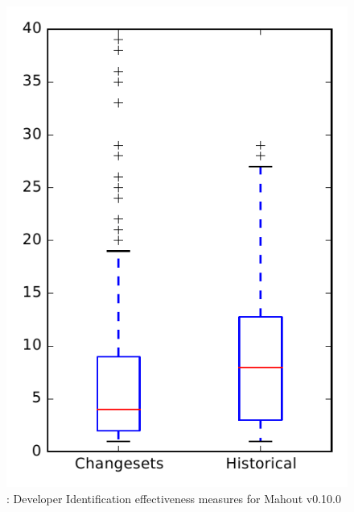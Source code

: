 
\begin{figure}
\centering
\includegraphics[height=0.4\textheight]{figures/dit/rq2_mahout}
\caption{\dtwo: Developer Identification effectiveness measures for Mahout v0.10.0}
\label{fig:dit:rq2:mahout}
\end{figure}
